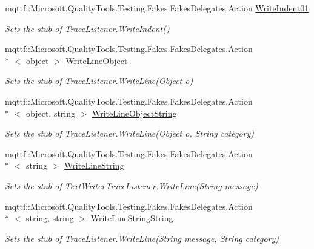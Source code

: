 \begin{DoxyCompactItemize}
mqttf\-::\-Microsoft.\-Quality\-Tools.\-Testing.\-Fakes.\-Fakes\-Delegates.\-Action \hyperlink{class_system_1_1_diagnostics_1_1_fakes_1_1_stub_text_writer_trace_listener_a043bfaf869729b955f1a4ef5d6d1f395}{Write\-Indent01}
\begin{DoxyCompactList}\small\item\em Sets the stub of Trace\-Listener.\-Write\-Indent()\end{DoxyCompactList}\item 
mqttf\-::\-Microsoft.\-Quality\-Tools.\-Testing.\-Fakes.\-Fakes\-Delegates.\-Action\\*
$<$ object $>$ \hyperlink{class_system_1_1_diagnostics_1_1_fakes_1_1_stub_text_writer_trace_listener_ab0fbb46d59d02a9d5f3916122133d1e2}{Write\-Line\-Object}
\begin{DoxyCompactList}\small\item\em Sets the stub of Trace\-Listener.\-Write\-Line(\-Object o)\end{DoxyCompactList}\item 
mqttf\-::\-Microsoft.\-Quality\-Tools.\-Testing.\-Fakes.\-Fakes\-Delegates.\-Action\\*
$<$ object, string $>$ \hyperlink{class_system_1_1_diagnostics_1_1_fakes_1_1_stub_text_writer_trace_listener_a25cfe61324fd43ea4f07858c0a40eb01}{Write\-Line\-Object\-String}
\begin{DoxyCompactList}\small\item\em Sets the stub of Trace\-Listener.\-Write\-Line(\-Object o, String category)\end{DoxyCompactList}\item 
mqttf\-::\-Microsoft.\-Quality\-Tools.\-Testing.\-Fakes.\-Fakes\-Delegates.\-Action\\*
$<$ string $>$ \hyperlink{class_system_1_1_diagnostics_1_1_fakes_1_1_stub_text_writer_trace_listener_a21138fd21d0ba203bd84b6be033c8b00}{Write\-Line\-String}
\begin{DoxyCompactList}\small\item\em Sets the stub of Text\-Writer\-Trace\-Listener.\-Write\-Line(\-String message)\end{DoxyCompactList}\item 
mqttf\-::\-Microsoft.\-Quality\-Tools.\-Testing.\-Fakes.\-Fakes\-Delegates.\-Action\\*
$<$ string, string $>$ \hyperlink{class_system_1_1_diagnostics_1_1_fakes_1_1_stub_text_writer_trace_listener_a9c3016ff67ffde823c22b6e128b4f4c8}{Write\-Line\-String\-String}
\begin{DoxyCompactList}\small\item\em Sets the stub of Trace\-Listener.\-Write\-Line(\-String message, String category)\end{DoxyCompactList}\item 

\end{DoxyCompactItemize}
